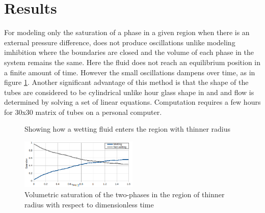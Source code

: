\documentclass[11pt]{article}
\begin{document}
	\section*{Results}
		For modeling only the saturation of a phase in a given region \cite{bib5} when there is an external pressure difference, does not produce oscillations unlike modeling imhibition where the boundaries are closed and the volume of each phase in the system remains the same. Here the fluid does not reach an equilibrium position in a finite amount of time. However the small oscillations dampens over time, as in figure \ref{fig:sat-vs-time}. Another significant advantage of this method is that the shape of the tubes are considered to be cylindrical unlike hour glass shape in \cite{bib3} and and flow is determined by solving a set of linear equations. Computation requires a few hours for 30x30 matrix of tubes on a personal computer.
		\begin{figure}[H]
			\centering
			\caption{Showing how a wetting fluid enters the region with thinner radius}
		\end{figure}
		\begin{figure}[H]
			\centering
			\includegraphics[width=0.5\textwidth]{plot-sat-vs-time}
			\caption{Volumetric saturation of the two-phases in the region of thinner radius with respect to dimensionless time}
			\label{fig:sat-vs-time}
		\end{figure}
\end{document}
